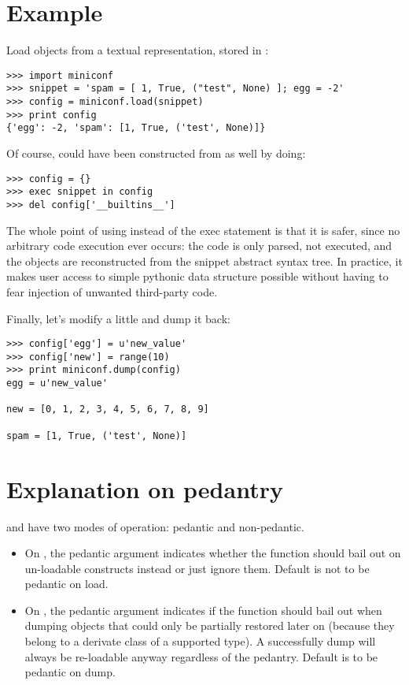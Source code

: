 \documentclass{howto}
\begin{document}
\section{Example}

Load objects from a textual representation, stored in :

\begin{verbatim}
>>> import miniconf
>>> snippet = 'spam = [ 1, True, ("test", None) ]; egg = -2'
>>> config = miniconf.load(snippet)
>>> print config
{'egg': -2, 'spam': [1, True, ('test', None)]}
\end{verbatim}

Of course,  could have been constructed from  as well
by doing:

\begin{verbatim}
>>> config = {}
>>> exec snippet in config
>>> del config['__builtins__']
\end{verbatim}

The whole point of using  instead of the exec statement is that
it is safer, since no arbitrary code execution ever occurs: the code is only
parsed, not executed, and the objects are reconstructed from the snippet
abstract syntax tree. In practice, it makes user access to simple pythonic data
structure possible without having to fear injection of unwanted third-party
code.

Finally, let's modify  a little and dump it back:

\begin{verbatim}
>>> config['egg'] = u'new_value'
>>> config['new'] = range(10)
>>> print miniconf.dump(config)
egg = u'new_value'

new = [0, 1, 2, 3, 4, 5, 6, 7, 8, 9]

spam = [1, True, ('test', None)]
\end{verbatim}

\section{Explanation on pedantry}

 and  have two modes of operation: pedantic and
non-pedantic.

\begin{itemize}
\item
On , the pedantic argument indicates whether the function should
bail out on un-loadable constructs instead or just ignore them. Default is not
to be pedantic on load.

\item
On , the pedantic argument indicates if the function should bail
out when dumping objects that could only be partially restored later on (because
they belong to a derivate class of a supported type). A successfully dump will
always be re-loadable anyway regardless of the pedantry. Default is to be
pedantic on dump.
\end{itemize}
\end{document}
